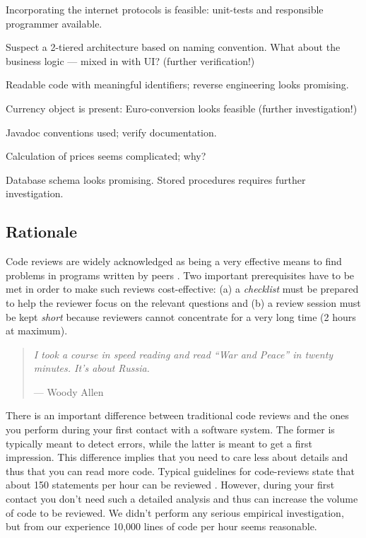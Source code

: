 \documentclass[a4paper,10pt,twoside]{book}
\begin{document}
\begin{bulletlist}
  \item Incorporating the internet protocols is feasible: unit-tests and responsible programmer available.

  \item Suspect a 2-tiered architecture based on naming convention. What about the business logic --- mixed in with UI? (further verification!)

  \item Readable code with meaningful identifiers; reverse engineering looks promising.

  \item Currency object is present: Euro-conversion looks feasible (further investigation!)

  \item Javadoc conventions used; verify documentation.

  \item Calculation of prices seems complicated; why?

  \item Database schema looks promising. Stored procedures requires further investigation.

\end{bulletlist}

\subsection*{Rationale}

Code reviews are widely acknowledged as being a very effective means to find problems in programs written by peers \cite{Gilb93a} \cite{Glass97a}. Two important prerequisites have to be met in order to make such reviews cost-effective: (a) a \emph{checklist} must be prepared to help the reviewer focus on the relevant questions and (b) a review session must be kept \emph{short} because reviewers cannot concentrate for a very long time (2 hours at maximum).

\begin{quotation}
\noindent
\emph{I took a course in speed reading and read ``War and Peace'' in twenty minutes. It's about Russia.}

\hfill --- Woody Allen
\end{quotation}

There is an important difference between traditional code reviews and the ones you perform during your first contact with a software system. The former is typically meant to detect errors, while the latter is meant to get a first impression. This difference implies that you need to care less about details and thus that you can read more code. Typical guidelines for code-reviews state that about 150 statements per hour can be reviewed \cite{Barn94a}. However, during your first contact you don't need such a detailed analysis and thus can increase the volume of code to be reviewed. We didn't perform any serious empirical investigation, but from our experience 10,000 lines of code per hour seems reasonable.
\end{document}
